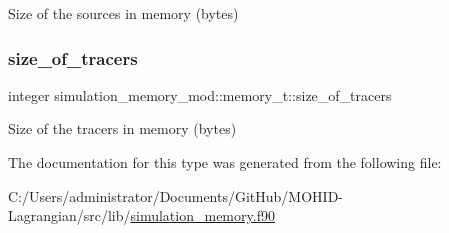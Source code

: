 Size of the sources in memory (bytes) 

\mbox{\label{structsimulation__memory__mod_1_1memory__t_a7b1960036177b6612be260699fcdb19a}} 
\subsubsection{\texorpdfstring{size\+\_\+of\+\_\+tracers}{size\_of\_tracers}}
{\footnotesize\ttfamily integer simulation\+\_\+memory\+\_\+mod\+::memory\+\_\+t\+::size\+\_\+of\+\_\+tracers\hspace{0.3cm}{\ttfamily [private]}}



Size of the tracers in memory (bytes) 



The documentation for this type was generated from the following file\+:\begin{DoxyCompactItemize}
\item 
C\+:/\+Users/administrator/\+Documents/\+Git\+Hub/\+M\+O\+H\+I\+D-\/\+Lagrangian/src/lib/\hyperlink{simulation__memory_8f90}{simulation\+\_\+memory.\+f90}\end{DoxyCompactItemize}
